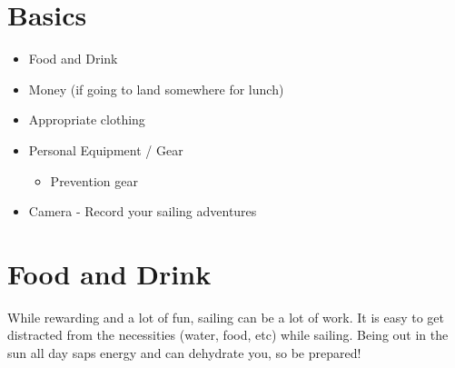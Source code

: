 \documentclass[fleqn,10pt]{navy} %
\begin{document}
\section{Basics}
\begin{itemize}[noitemsep]
    \item Food and Drink
    \item Money (if going to land somewhere for lunch)
    \item Appropriate clothing
    \item Personal Equipment / Gear
        \begin{itemize}
            \item Prevention gear
        \end{itemize}
    \item Camera - Record your sailing adventures
\end{itemize}

\section{Food and Drink}
While rewarding and a lot of fun, sailing can be a lot of work.  It is easy to get distracted from the necessities (water, food, etc) while sailing.  Being out in the sun all day saps energy and can dehydrate you, so be prepared!
\end{document}

